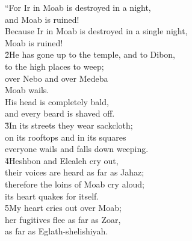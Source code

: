 \begin{poetry}
\poeml ``For Ir in Moab is destroyed in a night, \\
\poemll    and Moab is ruined! \\
\poeml Because Ir in Moab is destroyed in a single night, \\
\poemll    Moab is ruined! \\
\poeml \v{2}He has gone up to the temple, and to Dibon, \\
\poemll    to the high places to weep; \\
\poeml over Nebo and over Medeba \\
\poemll    Moab wails. \\
\poeml His head is completely bald, \\
\poemll    and every beard is shaved off. \\
\poeml \v{3}In its streets they wear sackcloth; \\
\poemll    on its rooftops and in its squares \\
\poemlll       everyone wails and falls down weeping. \\
\poeml \v{4}Heshbon and Elealeh cry out, \\
\poemll    their voices are heard as far as Jahaz; \\
\poeml therefore the loins of Moab cry aloud; \\
\poemll    its heart quakes for itself. \\
\poeml \v{5}My heart cries out over Moab; \\
\poemll    her fugitives flee as far as Zoar, \\
\poemlll       as far as Eglath-shelishiyah. \\

\end{poetry}
